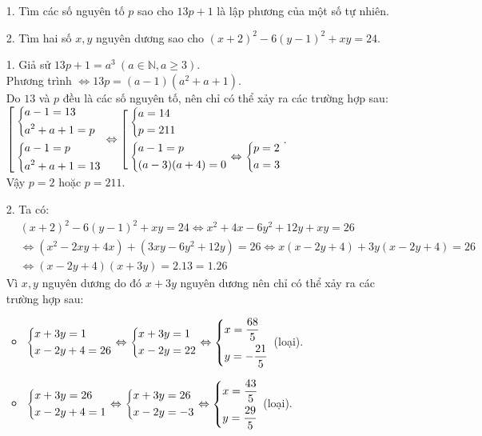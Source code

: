 \begin{bt}%
\hfill
\begin{enumerate}
	\item[1.] Tìm các số nguyên tố $p$ sao cho $13p+1$ là lập phương của một số tự nhiên.
	\item[2.] Tìm hai số $x,y$ nguyên dương sao cho $\left(x+2\right)^2-6\left(y-1\right)^2+xy=24$.
\end{enumerate}
\loigiai
{
	\begin{enumerate}
		\item[1.] Giả sử $13p+1=a^3\ (a\in\mathbb{N}, a\ge 3)$.\\
		Phương trình $\Leftrightarrow 13p=\left(a-1\right)\left(a^2+a+1\right)$.\\
		Do $13$ và $p$ đều là các số nguyên tố, nên chỉ có thể xảy ra các trường hợp sau:\\
		$\left[\begin{aligned}&\left\{\begin{aligned}&a-1=13\\&a^2+a+1=p\end{aligned}\right.\\&\left\{\begin{aligned}&a-1=p\\&a^2+a+1=13\end{aligned}\right.\end{aligned}\right.\Leftrightarrow \left[\begin{aligned}&\left\{\begin{aligned}&a=14\\&p=211\end{aligned}\right.\\&\left\{\begin{aligned}&a-1=p\\&(a-3)(a+4)=0\end{aligned}\right.\Leftrightarrow \left\{\begin{aligned}&p=2\\&a=3\end{aligned}\right.\end{aligned}\right.$.\\
		Vậy $p=2$ hoặc $p=211$.
		\item[2.] Ta có:\\ 
		$
		\begin{aligned}
		&\left(x+2\right)^2-6\left(y-1\right)^2+xy=24\Leftrightarrow x^2+4x-6y^2+12y+xy=26\\
		&\Leftrightarrow \left(x^2-2xy+4x\right)+\left(3xy-6y^2+12y\right)=26\Leftrightarrow x\left(x-2y+4\right)+3y\left(x-2y+4\right)=26\\
		&\Leftrightarrow \left(x-2y+4\right)\left(x+3y\right)=2.13=1.26
		\end{aligned}
		$\\
		Vì $x,y$ nguyên dương do đó $x+3y$ nguyên dương nên chỉ có thể xảy ra các trường hợp sau:
		\begin{itemize}
			\item $\left\{\begin{aligned}&x+3y=1\\&x-2y+4=26\end{aligned}\right.\Leftrightarrow \left\{\begin{aligned}&x+3y=1\\&x-2y=22\end{aligned}\right.\Leftrightarrow \left\{\begin{aligned}&x=\dfrac{68}{5}\\&y=-\dfrac{21}{5}\end{aligned}\right.$ (loại).
			\item $\left\{\begin{aligned}&x+3y=26\\&x-2y+4=1\end{aligned}\right.\Leftrightarrow \left\{\begin{aligned}&x+3y=26\\&x-2y=-3\end{aligned}\right.\Leftrightarrow \left\{\begin{aligned}&x=\dfrac{43}{5}\\&y=\dfrac{29}{5}\end{aligned}\right.$ (loại).

\end{itemize}
\end{enumerate}}
\end{bt}
